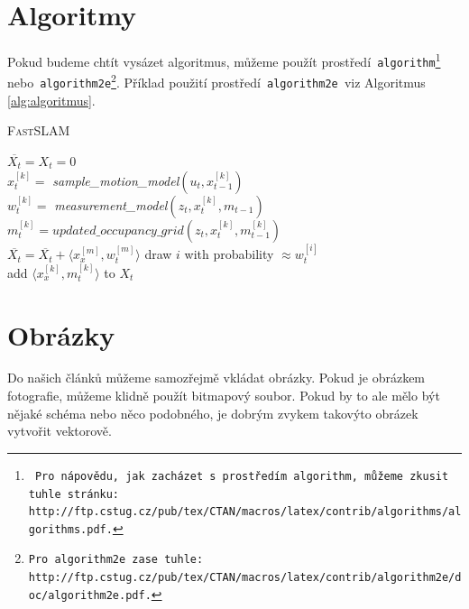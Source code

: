 \documentclass[a4paper, 11pt]{article}
\begin{document}
\section{Algoritmy}
\label{sekcealgoritmy}
Pokud budeme chtít vysázet algoritmus, můžeme použít prostředí\texttt{ algorithm\footnote{\
Pro nápovědu, jak zacházet s~prostředím\texttt{ algorithm, }můžeme zkusit tuhle stránku:\\http://ftp.cstug.cz/pub/tex/CTAN/macros/latex/contrib/algorithms/algorithms.pdf.} }nebo\texttt{ algorithm2e\footnote{Pro\texttt{ algorithm2e }zase tuhle:
http://ftp.cstug.cz/pub/tex/CTAN/macros/latex/contrib/algorithm2e/doc/algorithm2e.pdf.}}.
Příklad použití prostředí\texttt{ algorithm2e }viz Algoritmus \ref{alg:algoritmus}.


\bigskip
{}
\begin{algorithm}[H]
\caption{\textsc{Fast}SLAM}
\label{alg:algoritmus}
\SetNlSty{}{}{:  } %
\SetInd{1em}{1em}
\SetNlSkip{-1.33em}
\BlankLine
\Indp \Indp
    $\overline{X_t} = X_t = 0$\\
    { 
        $x_t^{[k]} =$ \emph{sample\_motion\_model}$(u_t,x_{t-1}^{[k]})$\\
        $w_t^{[k]} =$ \emph{measurement\_model}$(z_t,x_t^{[k]},m_{t-1})$\\
        $m_t^{[k]} = updated\_occupancy\_grid(z_t,x_t^{[k]},m_{t-1}^{[k]})$\\
        $\overline{X_t} = \overline{X_t} + \langle x_x^{[m]},w_t^{[m]}\rangle$
    }
    {
        draw $i$ with probability $\approx w_t^{[i]}$\\
        add $\langle x_x^{[k]},m_t^{[k]}\rangle$ to $X_t$\\
    }
\end{algorithm}
\bigskip
\section{Obrázky}
Do našich článků můžeme samozřejmě vkládat obrázky. Pokud je obrázkem fotografie,
můžeme klidně použít bitmapový soubor. Pokud by to ale mělo být nějaké schéma nebo
něco podobného, je dobrým zvykem takovýto obrázek vytvořit vektorově.
\end{document}
